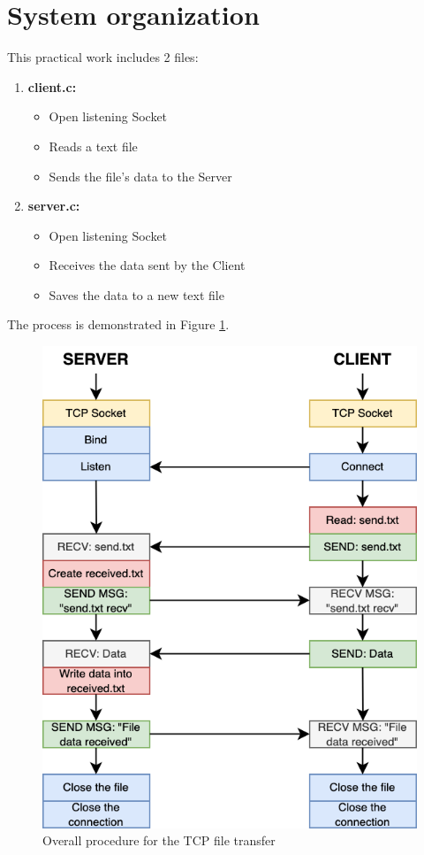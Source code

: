 \section{System organization}

This practical work includes 2 files:
\begin{enumerate}
    \item \textbf{client.c:}
        \begin{itemize}
            \item Open listening Socket
            \item Reads a text file
            \item Sends the file's data to the Server
        \end{itemize}
    \item \textbf{server.c:} 
        \begin{itemize}
            \item Open listening Socket
            \item Receives the data sent by the Client
            \item Saves the data to a new text file
        \end{itemize}
\end{enumerate}
The process\cite{roxtomar2021filetransfer} is demonstrated in Figure \ref{fig:sys-org}.

\begin{figure}
    \centering
    \includegraphics[width=0.9\linewidth]{attachments/system-organization.png}
    \caption{Overall procedure for the TCP file transfer}
    \label{fig:sys-org}
\end{figure}

